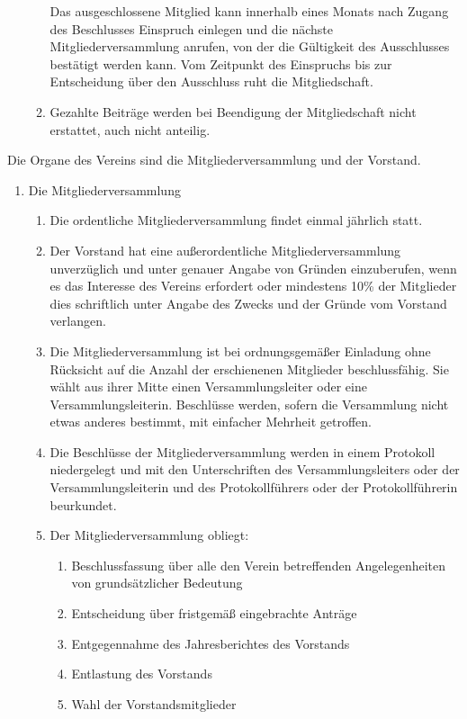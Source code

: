 \documentclass[parskip=half]{scrartcl}
\begin{document}
\begin{contract}
\begin{enumerate}
\begin{enumerate}
				Das ausgeschlossene Mitglied kann innerhalb eines Monats nach Zugang des Beschlusses Einspruch einlegen und die nächste Mitgliederversammlung anrufen, von der die Gültigkeit des Ausschlusses bestätigt werden kann. Vom Zeitpunkt des Einspruchs bis zur Entscheidung über den Ausschluss ruht die Mitgliedschaft.
				\item Gezahlte Beiträge werden bei Beendigung der Mitgliedschaft nicht erstattet, auch nicht anteilig.
			\end{enumerate}
		\end{enumerate}
		Die Organe des Vereins sind die Mitgliederversammlung und der Vorstand.
		\begin{enumerate}
			\item Die Mitgliederversammlung
			\begin{enumerate}
				\item Die ordentliche Mitgliederversammlung findet einmal jährlich statt.
				\item Der Vorstand hat eine außerordentliche Mitgliederversammlung unverzüglich und unter genauer Angabe von Gründen einzuberufen, wenn es das Interesse des Vereins erfordert oder mindestens 10\% der Mitglieder dies schriftlich unter Angabe des Zwecks und der Gründe vom Vorstand verlangen.
				\item Die Mitgliederversammlung ist bei ordnungsgemäßer Einladung ohne Rücksicht auf die Anzahl der erschienenen Mitglieder beschlussfähig. Sie wählt aus ihrer Mitte einen Versammlungsleiter oder eine Versammlungsleiterin. Beschlüsse werden, sofern die Versammlung nicht etwas anderes bestimmt, mit einfacher Mehrheit getroffen.
				\item Die Beschlüsse der Mitgliederversammlung werden in einem Protokoll niedergelegt und mit den Unterschriften des Versammlungsleiters oder der Versammlungsleiterin und des Protokollführers oder der Protokollführerin beurkundet.
				\item Der Mitgliederversammlung obliegt:
				\begin{enumerate}
					\item Beschlussfassung über alle den Verein betreffenden Angelegenheiten von grundsätzlicher Bedeutung
					\item Entscheidung über fristgemäß eingebrachte Anträge
					\item Entgegennahme des Jahresberichtes des Vorstands
					\item Entlastung des Vorstands
					\item Wahl der Vorstandsmitglieder

\end{enumerate}
\end{enumerate}
\end{enumerate}
\end{contract}
\end{document}
